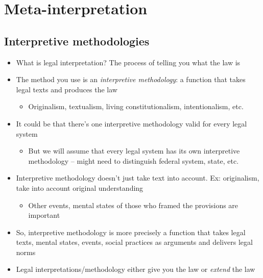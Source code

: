 \hypertarget{meta-interpretation}{%
\section{Meta-interpretation}\label{meta-interpretation}}

\hypertarget{interpretive-methodologies}{%
\subsection{Interpretive
methodologies}\label{interpretive-methodologies}}

\begin{itemize}
\tightlist
\item
  What is legal interpretation? The process of telling you what the law
  is
\item
  The method you use is an \emph{interpretive methodology}: a function
  that takes legal texts and produces the law

  \begin{itemize}
  \tightlist
  \item
    Originalism, textualism, living constitutionalism, intentionalism,
    etc.
  \end{itemize}
\item
  It could be that there's one interpretive methodology valid for every
  legal system

  \begin{itemize}
  \tightlist
  \item
    But we will assume that every legal system has its own interpretive
    methodology -- might need to distinguish federal system, state, etc.
  \end{itemize}
\item
  Interpretive methodology doesn't just take text into account. Ex:
  originalism, take into account original understanding

  \begin{itemize}
  \tightlist
  \item
    Other events, mental states of those who framed the provisions are
    important
  \end{itemize}
\item
  So, interpretive methodology is more precisely a function that takes
  legal texts, mental states, events, social practices as arguments and
  delivers legal norms
\item
  Legal interpretations/methodology either give you the law or
  \emph{extend} the law


\end{itemize}
